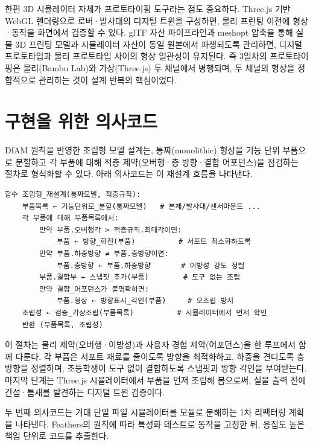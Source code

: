 한편 3D 시뮬레이터 자체가 프로토타이핑 도구라는 점도 중요하다. Three.js 기반 WebGL 렌더링\cite{threejs, webgl}으로 로버·발사대의 디지털 트윈을 구성하면, 물리 프린팅 이전에 형상·동작을 화면에서 검증할 수 있다. glTF 자산 파이프라인\cite{gltf}과 meshopt 압축\cite{meshopt}을 통해 실물 3D 프린팅 모델과 시뮬레이터 자산이 동일 원본에서 파생되도록 관리하면, 디지털 프로토타입과 물리 프로토타입 사이의 형상 일관성이 유지된다\cite{akenine2018realtime}. 즉 3일차의 프로토타이핑은 물리(Bambu Lab)와 가상(Three.js) 두 채널에서 병행되며, 두 채널의 형상을 정합적으로 관리하는 것이 설계 반복의 핵심이었다.

\section{구현을 위한 의사코드}

DfAM 원칙을 반영한 조립형 모델 설계는, 통짜(monolithic) 형상을 기능 단위 부품으로 분할하고 각 부품에 대해 적층 제약(오버행·층 방향·결합 어포던스)을 점검하는 절차로 형식화할 수 있다. 아래 의사코드는 이 재설계 흐름을 나타낸다.

\begin{verbatim}
함수 조립형_재설계(통짜모델, 적층규칙):
    부품목록 ← 기능단위로_분할(통짜모델)   # 본체/발사대/센서마운트 ...
    각 부품에 대해 부품목록에서:
        만약 부품.오버행각 > 적층규칙.최대각이면:
            부품 ← 방향_회전(부품)          # 서포트 최소화하도록
        만약 부품.하중방향 ≠ 부품.층방향이면:
            부품.층방향 ← 부품.하중방향       # 이방성 강도 정렬
        부품.결합부 ← 스냅핏_추가(부품)        # 도구 없는 조립
        만약 결합_어포던스가 불명확하면:
            부품.형상 ← 방향표시_각인(부품)     # 오조립 방지
    조립성 ← 검증_가상조립(부품목록)          # 시뮬레이터에서 먼저 확인
    반환 (부품목록, 조립성)
\end{verbatim}

이 절차는 물리 제약(오버행·이방성)과 사용자 경험 제약(어포던스\cite{norman2013design})을 한 루프에서 함께 다룬다. 각 부품은 서포트 재료를 줄이도록 방향을 최적화하고, 하중을 견디도록 층 방향을 정렬하며, 초등학생이 도구 없이 결합하도록 스냅핏과 방향 각인을 부여받는다. 마지막  단계는 Three.js 시뮬레이터\cite{threejs}에서 부품을 먼저 조립해 봄으로써, 실물 출력 전에 간섭·틈새를 발견하는 디지털 트윈 검증이다.

두 번째 의사코드는 거대 단일 파일 시뮬레이터를 모듈로 분해하는 1차 리팩터링 계획을 나타낸다. Feathers의 원칙에 따라 특성화 테스트로 동작을 고정한 뒤, 응집도 높은 책임 단위로 코드를 추출한다.

